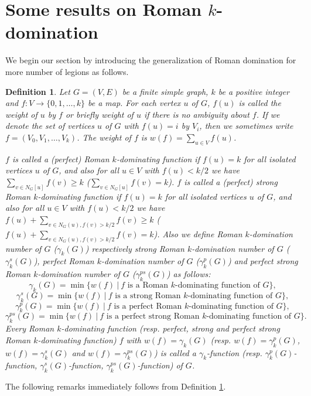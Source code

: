 \documentclass[12pt]{amsart}
\newtheorem{definition}[theorem]{Definition}
\begin{document}
\section{Some results on Roman $k$-domination}
We begin our section by introducing the generalization of Roman domination for more number of legions as follows.
\begin{definition}\label{2.1}
Let $G=(V,E)$ be a finite simple graph, $k$ be a positive integer and $f: V\rightarrow \{0, 1, \dots , k\}$ be a map. For each vertex $u$ of $G$, $f(u)$ is called the weight of $u$ by $f$ or briefly weight of $u$ if there is no ambiguity about $f$. If we denote the set of vertices $u$ of $G$ with $f(u)=i$ by $V_i$, then we sometimes write $f=(V_0, V_1, \dots, V_k)$. The weight of $f$ is $w(f)=\sum_{u\in V}f(u)$.

 $f$ is called a (perfect) Roman $k$-dominating function if $f(u)=k$ for all isolated vertices $u$ of $G$, and also for all $u\in V$ with $f(u)<k/2$ we have $\sum_{v\in N_G[u]}f(v)\geq k$ ($\sum_{v\in N_G[u]}f(v)= k$).
$f$ is called a (perfect) strong Roman $k$-dominating function if  $f(u)=k$ for all isolated vertices $u$ of $G$, and also for all $u\in V$ with $f(u)<k/2$ we have $f(u)+\sum_{v\in N_G(u), f(v)>k/2}f(v)\geq k$ ($f(u)+\sum_{v\in N_G(u), f(v)>k/2}f(v)= k$). Also we define Roman $ k$-domination number of $G$ ($\gamma_k(G)$) respectively strong Roman $k$-domination number of $G$ ($\gamma_k^s(G)$), perfect Roman $k$-domination number of $G$ ($\gamma_k^p(G)$) and perfect strong Roman $k$-domination number of $G$ ($\gamma_k^{ps}(G)$) as follows: 
$$\gamma_k(G)=\min \{w(f) \ | \ f \text{ is a Roman } k \text{-dominating function of } G\},$$
$$\gamma^s_k(G)=\min \{w(f) \ | \ f \text{ is a strong Roman } k \text{-dominating function of } G\},$$
$$\gamma^p _k(G)=\min \{w(f) \ | \ f \text{ is a perfect Roman } k \text{-dominating function of } G\},$$
$$\gamma^{ps}_k(G)=\min \{w(f) \ | \ f \text{ is a perfect strong Roman } k \text{-dominating function of } G\}.$$
 Every   Roman $k$-dominating function (resp. perfect, strong and perfect strong Roman $k$-dominating function) $f$ with $w(f)=\gamma_k(G)$ (resp. $w(f)=\gamma_k^p(G)$, $w(f)=\gamma_k^s(G)$ and $w(f)=\gamma_k^{ps}(G)$) is called a $\gamma_k$-function (resp. $\gamma_k^p(G)$-function, $\gamma_k^s(G)$-function, $\gamma_k^{ps}(G)$-function) of $G$.
\end{definition} 
The following remarks immediately follows from Definition \ref{2.1}.
\end{document}
